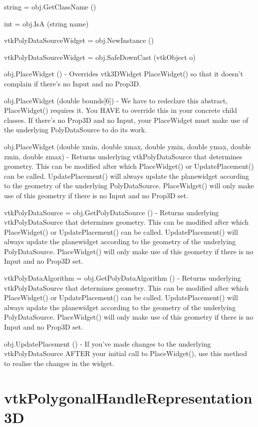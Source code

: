 \begin{DoxyItemize}
\item {\ttfamily string = obj.\-Get\-Class\-Name ()}  
\item {\ttfamily int = obj.\-Is\-A (string name)}  
\item {\ttfamily vtk\-Poly\-Data\-Source\-Widget = obj.\-New\-Instance ()}  
\item {\ttfamily vtk\-Poly\-Data\-Source\-Widget = obj.\-Safe\-Down\-Cast (vtk\-Object o)}  
\item {\ttfamily obj.\-Place\-Widget ()} -\/ Overrides vtk3\-D\-Widget Place\-Widget() so that it doesn't complain if there's no Input and no Prop3\-D.  
\item {\ttfamily obj.\-Place\-Widget (double bounds\mbox{[}6\mbox{]})} -\/ We have to redeclare this abstract, Place\-Widget() requires it. You H\-A\-V\-E to override this in your concrete child classes. If there's no Prop3\-D and no Input, your Place\-Widget must make use of the underlying Poly\-Data\-Source to do its work.  
\item {\ttfamily obj.\-Place\-Widget (double xmin, double xmax, double ymin, double ymax, double zmin, double zmax)} -\/ Returns underlying vtk\-Poly\-Data\-Source that determines geometry. This can be modified after which Place\-Widget() or Update\-Placement() can be called. Update\-Placement() will always update the planewidget according to the geometry of the underlying Poly\-Data\-Source. Place\-Widget() will only make use of this geometry if there is no Input and no Prop3\-D set.  
\item {\ttfamily vtk\-Poly\-Data\-Source = obj.\-Get\-Poly\-Data\-Source ()} -\/ Returns underlying vtk\-Poly\-Data\-Source that determines geometry. This can be modified after which Place\-Widget() or Update\-Placement() can be called. Update\-Placement() will always update the planewidget according to the geometry of the underlying Poly\-Data\-Source. Place\-Widget() will only make use of this geometry if there is no Input and no Prop3\-D set.  
\item {\ttfamily vtk\-Poly\-Data\-Algorithm = obj.\-Get\-Poly\-Data\-Algorithm ()} -\/ Returns underlying vtk\-Poly\-Data\-Source that determines geometry. This can be modified after which Place\-Widget() or Update\-Placement() can be called. Update\-Placement() will always update the planewidget according to the geometry of the underlying Poly\-Data\-Source. Place\-Widget() will only make use of this geometry if there is no Input and no Prop3\-D set.  
\item {\ttfamily obj.\-Update\-Placement ()} -\/ If you've made changes to the underlying vtk\-Poly\-Data\-Source A\-F\-T\-E\-R your initial call to Place\-Widget(), use this method to realise the changes in the widget.  
\end{DoxyItemize}\hypertarget{vtkwidgets_vtkpolygonalhandlerepresentation3d}{}\section{vtk\-Polygonal\-Handle\-Representation3\-D}\label{vtkwidgets_vtkpolygonalhandlerepresentation3d}
